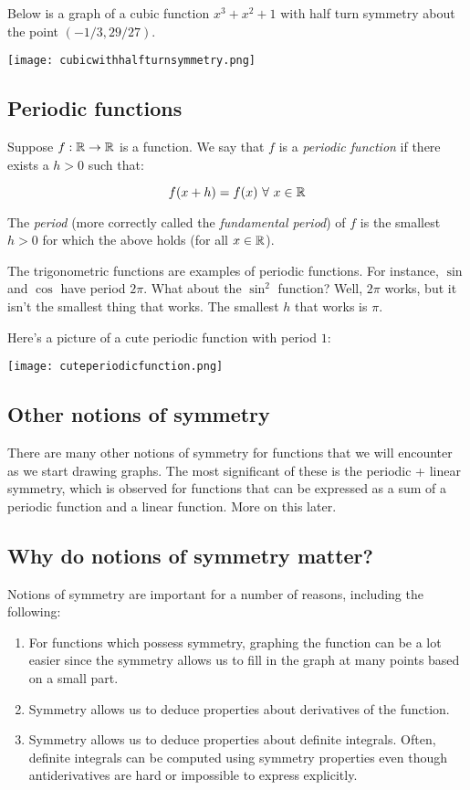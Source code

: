 \documentclass{amsart}
\begin{document}
Below is a graph of a cubic function $x^3 + x^2 + 1$ with half turn
symmetry about the point $(-1/3,29/27)$.

\texttt{[image: cubicwithhalfturnsymmetry.png]}

\subsection{Periodic functions}

Suppose $f:\mathbb{R} \to \mathbb{R}$ is a function. We say that $f$ is a {\em
periodic function} if there exists a $h > 0$ such that:

\begin{equation*}
  f(x + h) = f(x) \ \forall \ x \in \mathbb{R}
\end{equation*}

The {\em period} (more correctly called the {\em fundamental period})
of $f$ is the smallest $h > 0$ for which the above holds (for all $x
\in \mathbb{R}$).

The trigonometric functions are examples of periodic functions. For
instance, $\sin$ and $\cos$ have period $2\pi$. What about the
$\sin^2$ function? Well, $2\pi$ works, but it isn't the smallest thing
that works. The smallest $h$ that works is $\pi$.

Here's a picture of a cute periodic function with period $1$:

\texttt{[image: cuteperiodicfunction.png]}

\subsection{Other notions of symmetry}

There are many other notions of symmetry for functions that we will
encounter as we start drawing graphs. The most significant of these is
the periodic + linear symmetry, which is observed for functions that
can be expressed as a sum of a periodic function and a linear
function. More on this later.

\subsection{Why do notions of symmetry matter?}

Notions of symmetry are important for a number of reasons, including
the following:

\begin{enumerate}
\item For functions which possess symmetry, graphing the function can
  be a lot easier since the symmetry allows us to fill in the graph at
  many points based on a small part.
\item Symmetry allows us to deduce properties about derivatives of the
  function.
\item Symmetry allows us to deduce properties about definite
  integrals. Often, definite integrals can be computed using symmetry
  properties even though antiderivatives are hard or impossible to
  express explicitly.
\end{enumerate}
\end{document}
